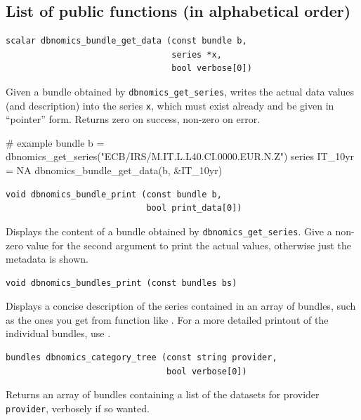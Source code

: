 \documentclass{article}
\begin{document}
\subsection{List of public functions (in alphabetical order)}

\begin{funcdoc}
\begin{verbatim}
scalar dbnomics_bundle_get_data (const bundle b,
                                 series *x,
                                 bool verbose[0])
\end{verbatim}
Given a bundle obtained by \texttt{dbnomics\_get\_series}, writes the
actual data values (and description) into the series \texttt{x}, which
must exist already and be given in ``pointer'' form. Returns zero on
success, non-zero on error.
\begin{code}
# example
bundle b = dbnomics_get_series("ECB/IRS/M.IT.L.L40.CI.0000.EUR.N.Z")
series IT_10yr = NA
dbnomics_bundle_get_data(b, &IT_10yr)
\end{code}
\end{funcdoc}

\begin{funcdoc}
\begin{verbatim}
void dbnomics_bundle_print (const bundle b,
                            bool print_data[0])
\end{verbatim}
Displays the content of a bundle obtained by
\texttt{dbnomics\_get\_series}. Give a non-zero value for the second
argument to print the actual values, otherwise just the metadata is
shown.
\end{funcdoc}

\begin{funcdoc}
\begin{verbatim}
void dbnomics_bundles_print (const bundles bs)
\end{verbatim}
Displays a concise description of the series contained in an array of
bundles, such as the ones you get from function like
. For a more detailed printout of the
individual bundles, use .
\end{funcdoc}

\begin{funcdoc}
\begin{verbatim}
bundles dbnomics_category_tree (const string provider,
                                bool verbose[0])
\end{verbatim}
  Returns an array of bundles containing a list of the datasets for
  provider \texttt{provider}, verbosely if so wanted.
\end{funcdoc}
\end{document}
